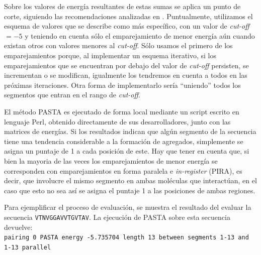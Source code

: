 Sobre los valores de energía resultantes de estas sumas se aplica un punto de corte, siguiendo las recomendaciones analizadas en \cite{walsh2014pasta}.
Puntualmente, utilizamos el esquema de valores que se describe como más específico, con un valor de \textit{cut-off}$=-5$ y teniendo en cuenta 
sólo el emparejamiento de menor energía aún cuando existan otros con valores menores al \textit{cut-off}.
Sólo usamos el primero de los emparejamientos porque, al implementar un esquema iterativo, si los emparejamientos que se encuentran por debajo  del valor de \textit{cut-off} persisten, se incrementan o se modifican,
igualmente los tendremos en cuenta a todos en las próximas iteraciones. Otra forma de implementarlo sería ``uniendo'' todos los segmentos que entran en el rango de \textit{cut-off}.



El método PASTA es ejecutado de forma local mediante un script escrito en lenguaje Perl, obtenido directamente de sus desarrolladores, junto con las matrices de energías.
Si los resultados indican que algún segmento de la secuencia tiene una tendencia considerable a la formación de agregados, 
simplemente se asigna un puntaje de 1 a cada posición de este.
Hay que tener en cuenta que, si bien la mayoria de las veces los emparejamientos de menor energía se corresponden con emparejamientos en forma paralela e \textit{in-register} (PIRA), es decir, 
que involucre el mismo segmento en ambas moléculas que interactúan, en el caso que esto no sea así se asigna el puntaje 1 a las posiciones de ambas regiones. 

Para ejemplificar el proceso de evaluación, se muestra el resultado del evaluar la secuencia \texttt{VTNVGGAVVTGVTAV}.
La ejecución de PASTA sobre esta secuencia devuelve: \\
\noindent
\texttt{pairing 0  PASTA energy -5.735704  length 13  between segments 1-13 and 1-13  parallel}


